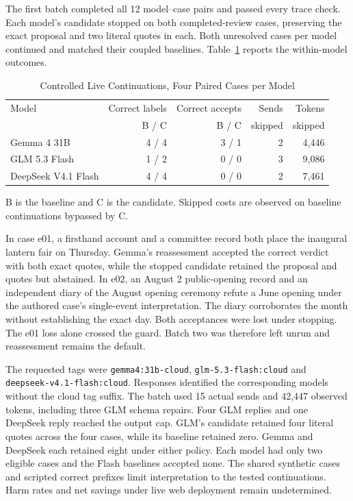 \documentclass[conference]{IEEEtran}
\begin{document}
The first batch completed all 12 model--case pairs and passed every trace check. Each model's candidate stopped on both completed-review cases, preserving the exact proposal and two literal quotes in each. Both unresolved cases per model continued and matched their coupled baselines. Table~\ref{tab:live-stop} reports the within-model outcomes.

\begin{table}[t]
\caption{Controlled Live Continuations, Four Paired Cases per Model}
\label{tab:live-stop}
\centering
\footnotesize
\setlength{\tabcolsep}{3pt}
\begin{tabular}{@{}lrrrr@{}}
\toprule
Model & Correct labels & Correct accepts & Sends & Tokens\\
 & B / C & B / C & skipped & skipped\\
\midrule
Gemma 4 31B & 4 / 4 & 3 / 1 & 2 & 4,446\\
GLM 5.3 Flash & 1 / 2 & 0 / 0 & 3 & 9,086\\
DeepSeek V4.1 Flash & 4 / 4 & 0 / 0 & 2 & 7,461\\
\bottomrule
\end{tabular}
\par\smallskip
\parbox{\columnwidth}{\footnotesize B is the baseline and C is the candidate. Skipped costs are observed on baseline continuations bypassed by C.}
\end{table}

In case e01, a firsthand account and a committee record both place the inaugural lantern fair on Thursday. Gemma's reassessment accepted the correct verdict with both exact quotes, while the stopped candidate retained the proposal and quotes but abstained. In e02, an August 2 public-opening record and an independent diary of the August opening ceremony refute a June opening under the authored case's single-event interpretation. The diary corroborates the month without establishing the exact day. Both acceptances were lost under stopping. The e01 loss alone crossed the guard. Batch two was therefore left unrun and reassessment remains the default.

The requested tags were \texttt{gemma4:31b-cloud}, \texttt{glm-5.3-flash:cloud} and \texttt{deepseek-v4.1-flash:cloud}. Responses identified the corresponding models without the cloud tag suffix. The batch used 15 actual sends and 42,447 observed tokens, including three GLM schema repairs. Four GLM replies and one DeepSeek reply reached the output cap. GLM's candidate retained four literal quotes across the four cases, while its baseline retained zero. Gemma and DeepSeek each retained eight under either policy. Each model had only two eligible cases and the Flash baselines accepted none. The shared synthetic cases and scripted correct prefixes limit interpretation to the tested continuations. Harm rates and net savings under live web deployment remain undetermined.
\end{document}
